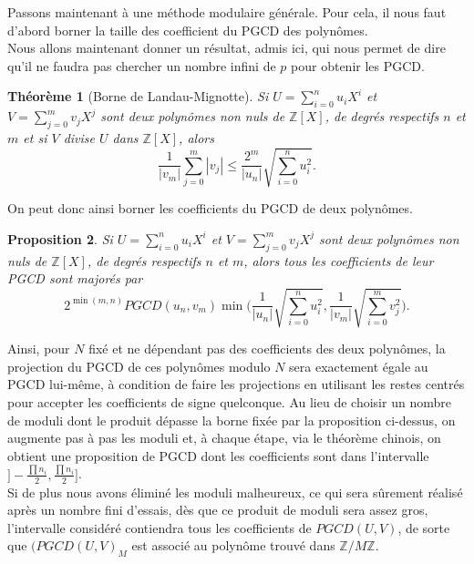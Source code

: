 \documentclass[12pt]{report}
\newtheorem{thm}{Théorème}[chapter]
\newtheorem{Prop}[thm]{Proposition}
\begin{document}
Passons maintenant à une méthode modulaire générale. Pour cela, il nous faut d'abord borner la taille des coefficient du PGCD des polynômes.\\

Nous allons maintenant donner un résultat, admis ici, qui nous permet de dire qu'il ne faudra pas chercher un nombre infini de $p$ pour obtenir les PGCD.

\begin{thm}[Borne de Landau-Mignotte]
Si $U= \sum \limits_{i=0}^{n}u_iX^i$ et $V= \sum \limits_{j=0}^{m}v_jX^j$ sont deux polynômes non nuls de $\mathbb{Z}[X]$, de degrés respectifs $n$ et $m$ et si $V$ divise $U$ dans $\mathbb{Z}[X]$, alors
$$     \frac{1}{|v_m|} \sum_{j=0}^m |v_j| \leq \frac{2^m}{|u_n|} \sqrt{\sum_{i=0}^n u_i^2} .      $$
\end{thm}

On peut donc ainsi borner les coefficients du PGCD de deux polynômes.

\begin{Prop}
Si $U= \sum \limits_{i=0}^{n}u_iX^i$ et $V= \sum \limits_{j=0}^{m}v_jX^j$ sont deux polynômes non nuls de $\mathbb{Z}[X]$, de degrés respectifs $n$ et $m$, alors tous les coefficients de leur PGCD sont majorés par 
$$    2^{\min (m,n) }  PGCD(u_n  , v_m)  \min  \Big(  \frac{1}{|u_n|} \sqrt{\sum_{i=0}^n u_i^2} ,\frac{1}{|v_m|} \sqrt{\sum_{i=0}^m v_j^2}    \Big)   .         $$
\end{Prop}

Ainsi, pour $N$ fixé et ne dépendant pas des coefficients des deux polynômes, la projection du PGCD de ces polynômes modulo $N$ sera exactement égale au PGCD lui-même, à condition de faire les projections en utilisant les restes centrés pour accepter les coefficients de signe quelconque. Au lieu de choisir un nombre de moduli dont le produit dépasse la borne fixée par la proposition ci-dessus, on augmente pas à pas les moduli et, à chaque étape, via le théorème chinois, on obtient une proposition de PGCD dont les coefficients sont dans l'intervalle $] -\tfrac{\prod n_i}{2}, \tfrac{\prod n_i}{2} ]$. \\

Si de plus nous avons éliminé les moduli malheureux, ce qui sera sûrement réalisé après un nombre fini d'essais, dès que ce produit de moduli sera assez gros, l'intervalle considéré contiendra tous les coefficients de $PGCD(U,V)$, de sorte que $(PGCD(U,V)_M$ est associé au polynôme trouvé dans $\mathbb{Z}/M\mathbb{Z}$.\\
\end{document}
